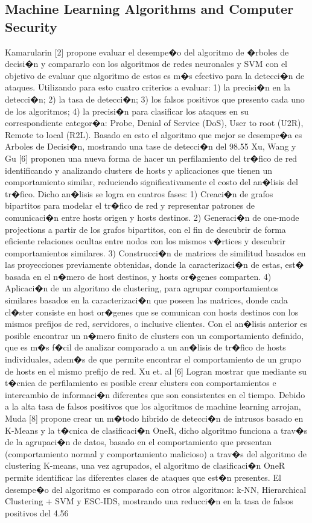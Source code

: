 \documentclass{article}
\begin{document}
\subsection{Machine Learning Algorithms and Computer Security} %
Kamarularin [2] propone evaluar el desempe�o del algoritmo de �rboles de decisi�n y compararlo con los algoritmos de redes neuronales y SVM con el objetivo de evaluar que algoritmo de estos es  m�s efectivo para la detecci�n de ataques. Utilizando para esto cuatro criterios a evaluar: 1) la precisi�n en la detecci�n; 2) la tasa de detecci�n; 3) los falsos positivos que presento cada uno de los algoritmos; 4) la precisi�n para clasificar los ataques en su correspondiente categor�a: Probe, Denial of Service (DoS), User to root (U2R), Remote to local (R2L). Basado en esto el algoritmo que mejor se desempe�a es Arboles de Decisi�n, mostrando una tase de detecci�n del 98.55%
Xu, Wang y Gu [6] proponen una nueva forma de hacer un perfilamiento del tr�fico de red identificando y analizando clusters de hosts y aplicaciones que tienen un comportamiento similar, reduciendo significativamente el costo del an�lisis del tr�fico. Dicho an�lisis se logra en cuatros fases: 
1) Creaci�n de grafos bipartitos para modelar el tr�fico de red y representar patrones de comunicaci�n entre hosts origen y hosts destinos.
2) Generaci�n de one-mode projections a partir de los grafos bipartitos, con el fin de descubrir de forma eficiente relaciones ocultas entre nodos con los mismos v�rtices y descubrir comportamientos similares.
3) Construcci�n de matrices de similitud basados en las proyecciones previamente obtenidas, donde la caracterizaci�n de estas, est� basada en el n�mero de host destinos, y hosts or�genes comparten.
4) Aplicaci�n de un algoritmo de clustering, para agrupar comportamientos similares basados en la caracterizaci�n que poseen las matrices, donde cada cl�ster consiste en host or�genes que se comunican con hosts destinos con los mismos prefijos de red, servidores, o inclusive clientes. 
Con el an�lisis anterior es posible encontrar un n�mero finito de clusters con un comportamiento definido, que es m�s f�cil de analizar comparado a un an�lisis de tr�fico de hosts individuales, adem�s de que permite encontrar el comportamiento de un grupo de hosts en el mismo prefijo de red. Xu et. al [6] Logran mostrar que mediante su t�cnica de perfilamiento es posible crear clusters con comportamientos e intercambio de informaci�n diferentes que son consistentes en el tiempo.
Debido a la alta tasa de falsos positivos que los algoritmos de machine learning arrojan, Muda [8] propone crear un m�todo hibrido de detecci�n de intrusos basado en K-Means y la t�cnica de clasificaci�n OneR, dicho algoritmo funciona a trav�s de la agrupaci�n de datos, basado en el comportamiento que presentan (comportamiento normal y comportamiento malicioso) a trav�s del algoritmo de clustering K-means, una vez agrupados, el algoritmo de clasificaci�n OneR permite identificar las diferentes clases de ataques que est�n presentes. El desempe�o del algoritmo es comparado con otros algoritmos: k-NN, Hierarchical Clustering + SVM y ESC-IDS, mostrando una reducci�n en la tasa de falsos positivos del 4.56%
\end{document}
